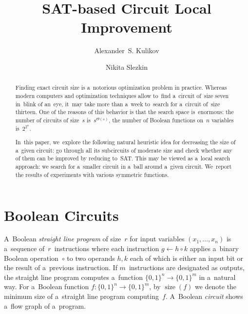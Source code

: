 \documentclass[12pt,letterpaper]{article}
\DeclareMathOperator{\size}{size}
\begin{document}
\sloppy

\title{SAT-based Circuit Local Improvement}
\author{Alexander~S. Kulikov \and Nikita Slezkin}
\maketitle

\begin{abstract}
Finding exact circuit size 
is a~notorious optimization
problem in practice. Whereas modern computers 
and optimization techniques allow to~find a~circuit 
of~size seven in~blink of an~eye, it~may take more 
than a~week to~search for a~circuit of~size thirteen.
One of the reasons of this behavior is that the search 
space is~enormous: the number of circuits of size~$s$ 
is~$s^{\Theta(s)}$, the number of Boolean functions on~$n$ variables is~$2^{2^n}$.

In~this paper, we~explore the following natural
heuristic idea for decreasing the size of
a~given circuit: go through all its subcircuits
of moderate size and check whether 
any of them can be improved by reducing to~SAT. 
This may be viewed
as a~local search approach: we search for a~smaller
circuit in a~ball around a~given circuit.
We~report the results of experiments with various symmetric functions. 
\end{abstract}

\tableofcontents

\clearpage



\section{Boolean Circuits}
A~Boolean \emph{straight line program} 
of size~$r$ for input variables $(x_1, \dotsc, x_n)$ 
is a~sequence of~$r$~instructions where each 
instruction $g \gets h \circ k$ 
applies a~binary Boolean operation~$\circ$ to 
two operands $h,k$ each of which is either an input bit 
or the result of a~previous instruction. 
If $m$~instructions are designated as outputs,
the straight line program computes a~function 
$\{0,1\}^n \to \{0,1\}^m$ in a~natural way. For 
a~Boolean function $f \colon \{0,1\}^n \to \{0,1\}^m$,
by $\size(f)$ we denote the minimum size of 
a~straight line program
computing~$f$. A~Boolean \emph{circuit} 
shows a~flow graph of a~program.
\end{document}
